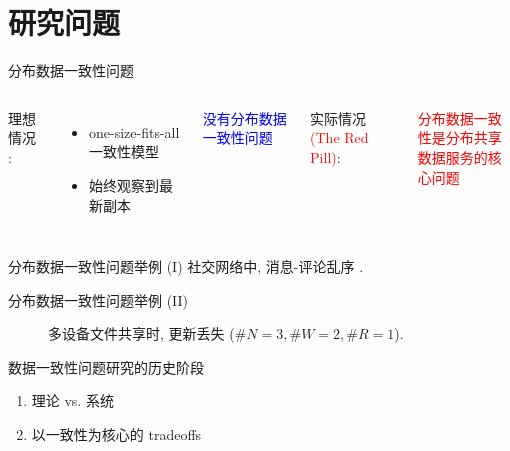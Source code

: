 \section{研究问题}

\begin{frame}{分布数据一致性问题}
  \begin{columns}[t]
	  理想情况 :
	  \begin{itemize}
		\item one-size-fits-all 一致性模型
		\item 始终观察到最新副本
	  \end{itemize}
	  \begin{center}
		\textcolor{blue}{没有分布数据一致性问题}
	  \end{center}
    \pause
	  实际情况 \textcolor{red}{\scriptsize (The Red Pill)}:
	  \begin{center}
		\textcolor{red}{分布数据一致性是分布共享\\数据服务的核心问题}
	  \end{center}
  \end{columns}
\end{frame}
\begin{frame}{分布数据一致性问题举例 (I)}
  {社交网络中, 消息-评论乱序 .}
\end{frame}
\begin{frame}{分布数据一致性问题举例 (II)}
  \begin{figure}[h!]
    \centering
    \begin{adjustbox}{max totalsize = {0.65\textwidth}{0.65\textheight}, center}
      
    \end{adjustbox}
    \caption{多设备文件共享时, 更新丢失 ($\#N = 3, \#W = 2, \#R = 1$).}
  \end{figure}
\end{frame}
\begin{frame}{数据一致性问题研究的历史阶段}

  \vspace{0.20cm}

  \begin{center}
	\begin{enumerate}
		\centering
	  \item 理论 vs. 系统
	  \item 以一致性为核心的 tradeoffs
	\end{enumerate}
  \end{center}
\end{frame}
